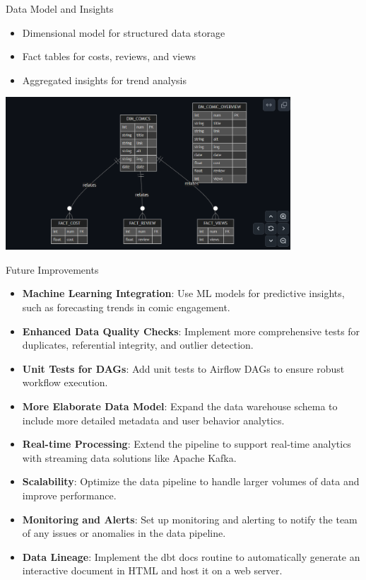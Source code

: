 \documentclass{beamer}
\begin{document}
\begin{frame}{Data Model and Insights}
    \begin{itemize}
        \item Dimensional model for structured data storage
        \item Fact tables for costs, reviews, and views
        \item Aggregated insights for trend analysis
    \end{itemize}
    \centering
    \includegraphics[width=0.8\textwidth]{../screenshots/er-diagram.png}
\end{frame}

\begin{frame}{Future Improvements}
    \begin{itemize}
        \item \textbf{Machine Learning Integration}: Use ML models for predictive insights, such as forecasting trends in comic engagement.
        \item \textbf{Enhanced Data Quality Checks}: Implement more comprehensive tests for duplicates, referential integrity, and outlier detection.
        \item \textbf{Unit Tests for DAGs}: Add unit tests to Airflow DAGs to ensure robust workflow execution.
        \item \textbf{More Elaborate Data Model}: Expand the data warehouse schema to include more detailed metadata and user behavior analytics.
        \item \textbf{Real-time Processing}: Extend the pipeline to support real-time analytics with streaming data solutions like Apache Kafka.
        \item \textbf{Scalability}: Optimize the data pipeline to handle larger volumes of data and improve performance.
        \item \textbf{Monitoring and Alerts}: Set up monitoring and alerting to notify the team of any issues or anomalies in the data pipeline.
        \item \textbf{Data Lineage}: Implement the dbt docs routine to automatically generate an interactive document in HTML and host it on a web server.
    \end{itemize}
\end{frame}
\end{document}

